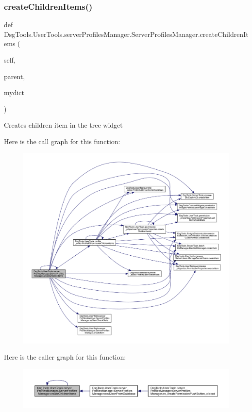 \subsubsection{\texorpdfstring{create\+Children\+Items()}{createChildrenItems()}}
{\footnotesize\ttfamily def Dsg\+Tools.\+User\+Tools.\+server\+Profiles\+Manager.\+Server\+Profiles\+Manager.\+create\+Children\+Items (\begin{DoxyParamCaption}\item[{}]{self,  }\item[{}]{parent,  }\item[{}]{mydict }\end{DoxyParamCaption})}

\begin{DoxyVerb}Creates children item in the tree widget
\end{DoxyVerb}
 Here is the call graph for this function\+:
\nopagebreak
\begin{figure}[H]
\begin{center}
\leavevmode
\includegraphics[width=350pt]{class_dsg_tools_1_1_user_tools_1_1server_profiles_manager_1_1_server_profiles_manager_a3da7f45f260e65c5f6afcde0b3a557f9_cgraph}
\end{center}
\end{figure}
Here is the caller graph for this function\+:
\nopagebreak
\begin{figure}[H]
\begin{center}
\leavevmode
\includegraphics[width=350pt]{class_dsg_tools_1_1_user_tools_1_1server_profiles_manager_1_1_server_profiles_manager_a3da7f45f260e65c5f6afcde0b3a557f9_icgraph}
\end{center}
\end{figure}

